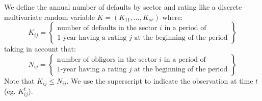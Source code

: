 \documentclass[11pt,fleqn]{book} %
\begin{document}
\begin{definition}
	We define the annual number of defaults by sector and rating like a
	discrete multivariate random variable $K=(K_{11}, \dots, K_{sr})$ where:
	\begin{displaymath}
		K_{ij} = \left\{
		\begin{array}{c}
			\text{number of defaults in the sector $i$ in a period of} \\
			\text{1-year having a rating $j$ at the beginning of the period}
		\end{array}
		\right\}
	\end{displaymath}
	taking in account that:
	\begin{displaymath}
		N_{ij} = \left\{
		\begin{array}{c}
			\text{number of obligors in the sector $i$ in a period of} \\
			\text{1-year having a rating $j$ at the beginning of the period}
		\end{array}
		\right\}
	\end{displaymath}
	Note that $K_{ij} \le N_{ij}$. We use the superscript to indicate 
	the observation at time $t$ (eg. $K_{ij}^t$).
\end{definition}
\end{document}
